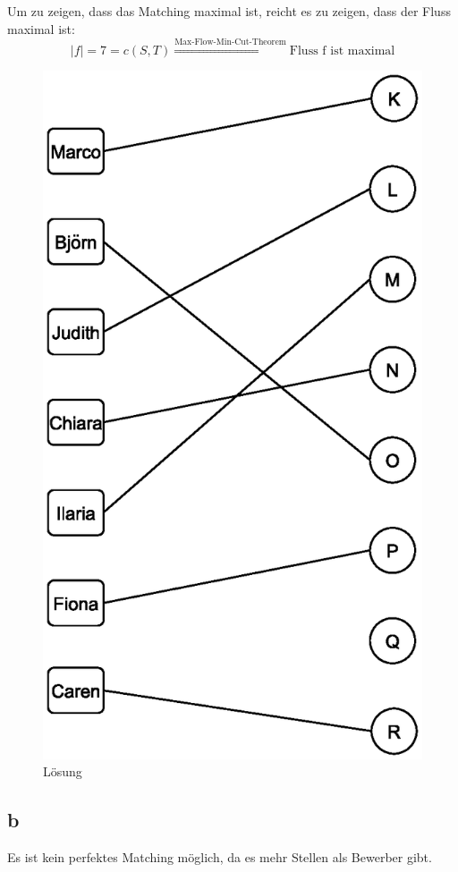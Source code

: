 \documentclass[a4paper,11pt,twoside]{scrartcl}
\begin{document}
Um zu zeigen, dass das Matching maximal ist, reicht es zu zeigen, dass der Fluss maximal ist:
\[ |f| = 7 = c(S,T) \overset{\text{Max-Flow-Min-Cut-Theorem}}{\Longrightarrow} \text{Fluss f ist maximal} \]
\begin{figure}
\centering
\includegraphics[width=0.9\linewidth]{img/res}
\caption{Lösung}
\label{fig:res}
\vspace*{-6em}
\end{figure}
\subsection*{b}
Es ist kein perfektes Matching möglich, da es mehr Stellen als Bewerber gibt.
\end{document}
